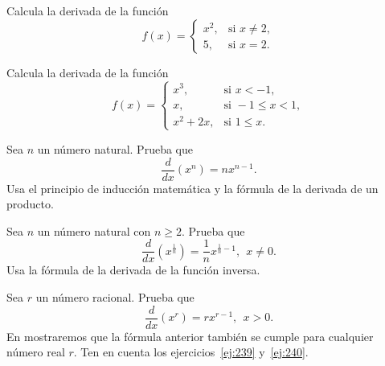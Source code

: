 \documentclass[12pt,a4paper]{book}
\begin{document}
    \begin{ejercicio}\label{ej:237}
        Calcula la derivada de la función
        \begin{equation*}
            f(x)=\begin{cases}
                x^{2}, & \text{si }x\neq 2,\\
                5, & \text{si }x=2.
            \end{cases}
        \end{equation*}
    \end{ejercicio}

    \begin{ejercicio}\label{ej:238}
        Calcula la derivada de la función
        \begin{equation*}
            f(x)=\begin{cases}
                x^{3}, & \text{si }x<-1,\\
                x, & \text{si }-1\leq x<1,\\
                x^{2}+2x, & \text{si }1\leq x.
            \end{cases}
        \end{equation*}
    \end{ejercicio}

    \begin{ejercicio}\label{ej:239}
        Sea $n$ un número natural. Prueba que
        \begin{equation*}
            \frac{d}{dx}(x^{n})=nx^{n-1}.
        \end{equation*}
        \sugerencia Usa el principio de inducción matemática y la fórmula de la
        derivada de un producto.
    \end{ejercicio}

    \begin{ejercicio}\label{ej:240}
        Sea $n$ un número natural con $n\geq 2$. Prueba que
        \begin{equation*}
            \frac{d}{dx}\left(x^{\frac{1}{n}}\right)=\frac{1}{n}x^{\frac{1}{n}-1},\ \ x\neq 0.
        \end{equation*}
        \sugerencia Usa la fórmula de la derivada de la función inversa.
    \end{ejercicio}

    \begin{ejercicio}\label{ej:241}
        Sea $r$ un número racional. Prueba que
        \begin{equation*}
            \frac{d}{dx}(x^{r})=rx^{r-1},\ \ x>0.
        \end{equation*}
        En \cite{nunez2020calculoII} mostraremos que la fórmula anterior también se cumple para cualquier
        número real $r$. \sugerencia Ten en cuenta los ejercicios~\ref{ej:239} y~\ref{ej:240}.
    \end{ejercicio}
\end{document}
